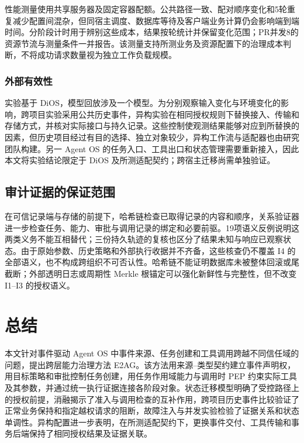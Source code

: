 性能测量使用共享服务器及固定容器配额。公共路径一致、配对顺序变化和5轮重复减少配置间混杂，但同宿主调度、数据库等待及客户端业务计算仍会影响端到端时间。分阶段计时用于辨别这些成本，结果按轮统计并保留变化范围；PR并发8的资源节流与测量条件一并报告。该测量支持所测业务及资源配置下的治理成本判断，不将成功请求数量视为独立工作负载规模。

\subsubsection{外部有效性}

实验基于 DiOS，模型回放涉及一个模型。为分别观察输入变化与环境变化的影响，跨项目实验采用公共历史事件，异构实验在相同授权规则下替换接入、传输和存储方式，并核对实际接口与持久记录。这些控制使观测结果能够对应到所替换的因素，但历史项目经过有目的选择、独立对象较少，异构工作流与适配器也由研究团队构建。另一 Agent OS 的任务入口、工具出口和状态管理需要重新接入，因此本文将实验结论限定于 DiOS 及所测适配契约；跨宿主迁移尚需单独验证。

\subsection{审计证据的保证范围}

在可信记录端与存储的前提下，哈希链检查已取得记录的内容和顺序，关系验证器进一步检查任务、能力、审批与调用记录的绑定和必要前驱。19项语义反例说明这两类义务不能互相替代；三份持久轨迹的复核也区分了结果未知与响应已观察状态。由于原始参数、历史策略和外部执行收据并不齐备，这些核查仍不覆盖 I4 的全部语义，也不构成跨组织不可否认性。哈希链不能证明数据库未被整体回滚或尾截断；外部透明日志或周期性 Merkle 根锚定可以强化新鲜性与完整性，但不改变 I1--I3 的授权语义。

\section{总结}\label{sec:conclusion-v11}

本文针对事件驱动 Agent OS 中事件来源、任务创建和工具调用跨越不同信任域的问题，提出跨层能力治理方法 E2AG。该方法用来源--类型契约建立事件声明权，用目标策略和审批控制任务创建，用任务作用域能力与调用时 PEP 约束实际工具及其参数，并通过统一执行证据连接各阶段对象。状态迁移模型明确了受控路径上的授权前提，消融揭示了准入与调用检查的互补作用，跨项目历史事件比较验证了正常业务保持和指定越权请求的阻断，故障注入与并发实验检验了证据关系和状态单调性。异构配置进一步表明，在所测适配契约下，更换事件交付、工具传输和事务后端保持了相同授权结果及证据关联。

